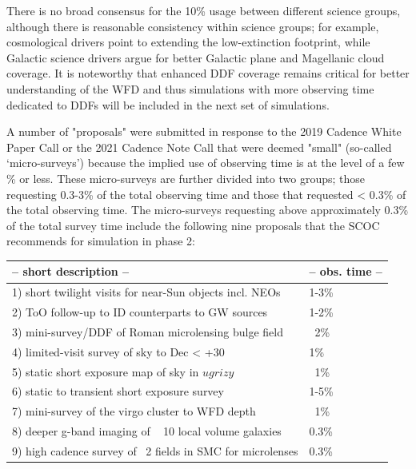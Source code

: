 There is no broad consensus for the 10\% usage between different science groups, although there is reasonable consistency within science groups; for example, cosmological drivers point to extending the low-extinction footprint, while Galactic science drivers argue for better Galactic plane and Magellanic cloud coverage. It is noteworthy that enhanced DDF coverage remains critical for better understanding of the WFD and thus simulations with more observing time dedicated to DDFs will be included in the next set of simulations. 

A number of "proposals" were submitted in response to the 2019 Cadence White Paper Call or the 2021 Cadence Note Call that were deemed "small" (so-called ‘micro-surveys’) because the implied use of observing time is at the level of a few \% or less. These micro-surveys are further divided into two groups; those requesting 0.3-3\% of the total observing time and those that requested < 0.3\% of the total observing time. The micro-surveys requesting above approximately 0.3\% of the total survey time include the following nine proposals that the SCOC recommends for simulation in phase 2:

\begin{table}[h]
\begin{tabular}{l | l}
             -- short description --             &                          -- obs. time -- \\
\hline
1) short twilight visits for near-Sun objects incl. NEOs      &   1-3\%  \\
2) ToO follow-up to ID counterparts to GW sources           &  1-2\% \\
3) mini-survey/DDF of Roman microlensing bulge field      &   ~2\% \\ 
4) limited-visit survey of sky to Dec < +30                          &    1\% \\ 
5) static short exposure map of sky in $ugrizy$                     &  ~1\% \\
6) static to transient short exposure survey                         & 1-5\% \\
7) mini-survey of the virgo cluster to WFD depth                 &  ~1\% \\
8) deeper g-band imaging of ~ 10 local volume galaxies     & 0.3\% \\
9) high cadence survey of ~2 fields in SMC for microlenses&  0.3\% \\
\hline
\end{tabular}
\end{table}
  
